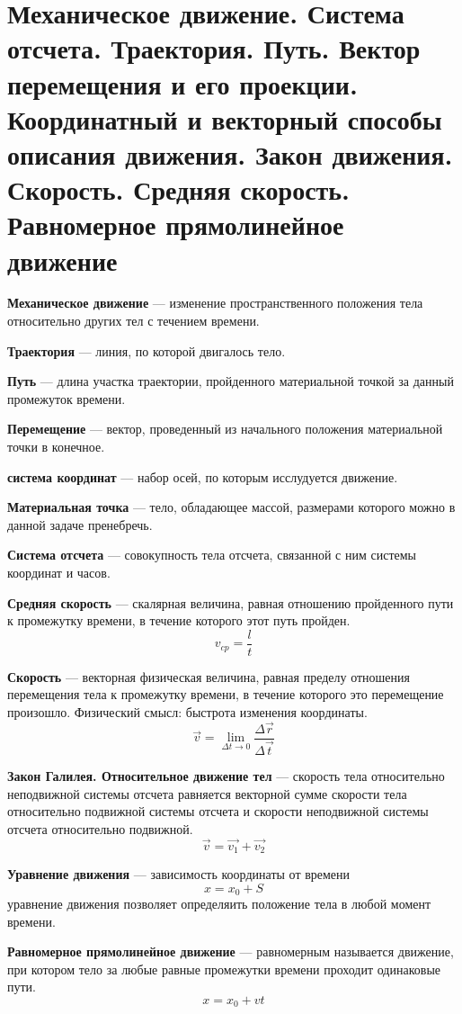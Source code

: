 \documentclass{report}
\begin{document}
\tableofcontents
\renewcommand{\partname}{Билет}
\part{Механическое движение. 
Система отсчета. 
Траектория. Путь. 
Вектор перемещения и его проекции. 
Координатный и векторный способы описания движения. 
Закон движения. 
Скорость. 
Средняя скорость. 
Равномерное прямолинейное движение}

{\bf Механическое движение} ---
изменение пространственного положения тела относительно других тел с течением времени. 

{\bf Траектория} ---
линия, по которой двигалось тело.

{\bf Путь} ---
длина участка траектории, пройденного материальной точкой за данный промежуток времени.

{\bf Перемещение} ---
вектор, проведенный из начального положения материальной точки в конечное. 

{\bf система координат} ---
набор осей, по которым исслудуется движение.

{\bf Материальная точка} ---
тело, обладающее массой, размерами которого можно в данной задаче пренебречь.

{\bf Система отсчета} ---
совокупность тела отсчета, связанной с ним системы координат и часов.

{\bf Средняя скорость} ---
скалярная величина, равная отношению пройденного пути к промежутку времени, 
в течение которого этот путь пройден. 
$$
v_{cp}=\frac{l}{t}
$$

{\bf Скорость} ---
векторная физическая величина, равная пределу отношения перемещения тела к промежутку 
времени, в течение которого это перемещение произошло.
Физический смысл: быстрота изменения координаты.
$$
\vec{v}=\lim_{\Delta t\rightarrow 0}\frac{\Delta \vec{r}}{\Delta \vec{t}}
$$

{\bf Закон Галилея. Относительное движение тел} ---
скорость тела относительно неподвижной системы отсчета равняется векторной сумме 
скорости тела относительно подвижной системы отсчета и скорости неподвижной 
системы отсчета относительно подвижной.
$$
\vec{v}=\vec{v_1}+\vec{v_2}
$$

{\bf Уравнение движения} ---
зависимость координаты от времени
$$
x=x_0+S
$$
уравнение движения позволяет определяить положение тела в любой момент времени.

{\bf Равномерное прямолинейное движение} ---
равномерным называется движение, при котором тело за любые равные промежутки времени 
проходит одинаковые пути.
$$
x=x_0+vt
$$
\end{document}
